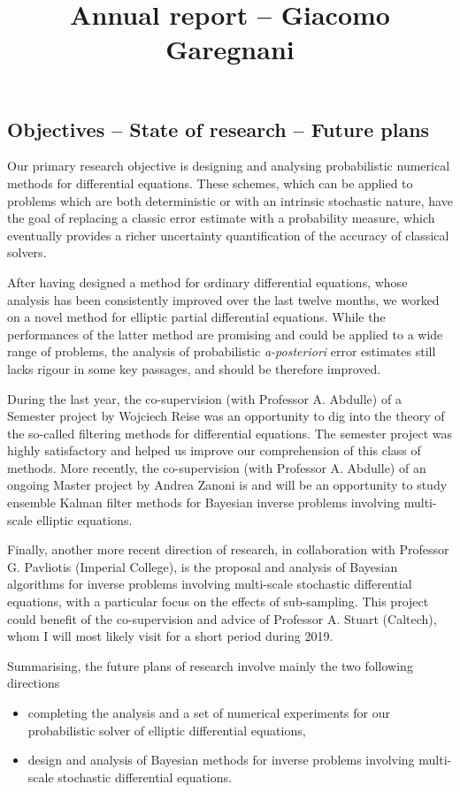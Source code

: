 \documentclass{article}
\title{\LARGE{Annual report -- Giacomo Garegnani}}
\author{}
\date{}
\theoremstyle{theorem}
\theoremstyle{definition}
\begin{document}
	\maketitle
		
	\subsection*{Objectives -- State of research -- Future plans}
	
	Our primary research objective is designing and analysing probabilistic numerical methods for differential equations. These schemes, which can be applied to problems which are both deterministic or with an intrinsic stochastic nature, have the goal of replacing a classic error estimate with a probability measure, which eventually provides a richer uncertainty quantification of the accuracy of classical solvers.
	
	After having designed a method for ordinary differential equations, whose analysis has been consistently improved over the last twelve months, we worked on a novel method for elliptic partial differential equations. While the performances of the latter method are promising and could be applied to a wide range of problems, the analysis of probabilistic \textit{a-posteriori} error estimates still lacks rigour in some key passages, and should be therefore improved.
	
	During the last year, the co-supervision (with Professor A. Abdulle) of a Semester project by Wojciech Reise was an opportunity to dig into the theory of the so-called filtering methods for differential equations. The semester project was highly satisfactory and helped us improve our comprehension of this class of methods. More recently, the co-supervision (with Professor A. Abdulle) of an ongoing Master project by Andrea Zanoni is and will be an opportunity to study ensemble Kalman filter methods for Bayesian inverse problems involving multi-scale elliptic equations.
		
	Finally, another more recent direction of research, in collaboration with Professor G. Pavliotis (Imperial College), is the proposal and analysis of Bayesian algorithms for inverse problems involving multi-scale stochastic differential equations, with a particular focus on the effects of sub-sampling. This project could benefit of the co-supervision and advice of Professor A. Stuart (Caltech), whom I will most likely visit for a short period during 2019. 
	
	Summarising, the future plans of research involve mainly the two following directions
	\begin{itemize}[label=-]
		\item completing the analysis and a set of numerical experiments for our probabilistic solver of elliptic differential equations,
		\item design and analysis of Bayesian methods for inverse problems involving multi-scale stochastic differential equations. 
	\end{itemize}
		
\end{document}
